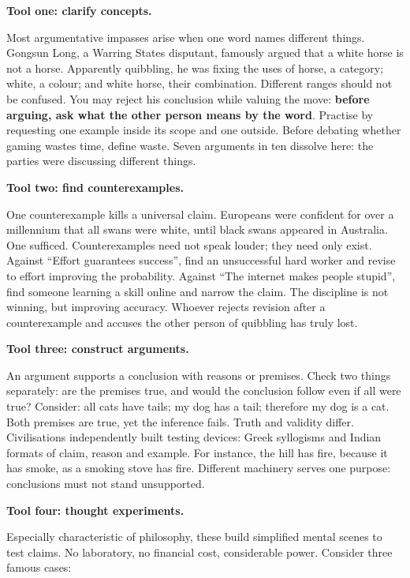\textbf{Tool one: clarify concepts.}

Most argumentative impasses arise when one word names different things. Gongsun Long, a Warring States disputant, famously argued that a white horse is not a horse. Apparently quibbling, he was fixing the uses of horse, a category; white, a colour; and white horse, their combination. Different ranges should not be confused. You may reject his conclusion while valuing the move: \textbf{before arguing, ask what the other person means by the word}. Practise by requesting one example inside its scope and one outside. Before debating whether gaming wastes time, define waste. Seven arguments in ten dissolve here: the parties were discussing different things.

\textbf{Tool two: find counterexamples.}

One counterexample kills a universal claim. Europeans were confident for over a millennium that all swans were white, until black swans appeared in Australia. One sufficed. Counterexamples need not speak louder; they need only exist. Against ``Effort guarantees success'', find an unsuccessful hard worker and revise to effort improving the probability. Against ``The internet makes people stupid'', find someone learning a skill online and narrow the claim. The discipline is not winning, but improving accuracy. Whoever rejects revision after a counterexample and accuses the other person of quibbling has truly lost.

\textbf{Tool three: construct arguments.}

An argument supports a conclusion with reasons or premises. Check two things separately: are the premises true, and would the conclusion follow even if all were true? Consider: all cats have tails; my dog has a tail; therefore my dog is a cat. Both premises are true, yet the inference fails. Truth and validity differ. Civilisations independently built testing devices: Greek syllogisms and Indian formats of claim, reason and example. For instance, the hill has fire, because it has smoke, as a smoking stove has fire. Different machinery serves one purpose: conclusions must not stand unsupported.

\textbf{Tool four: thought experiments.}

Especially characteristic of philosophy, these build simplified mental scenes to test claims. No laboratory, no financial cost, considerable power. Consider three famous cases:

